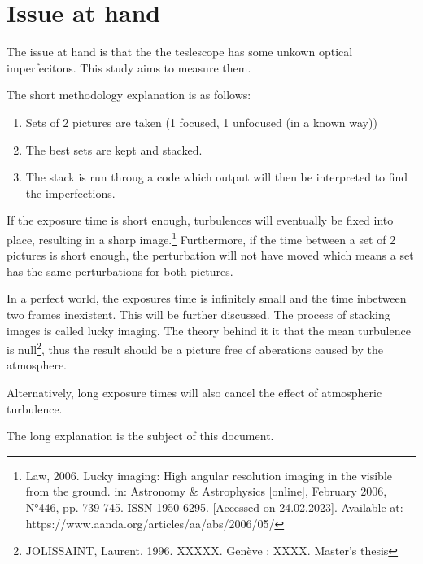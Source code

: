 \section{Issue at hand}

The issue at hand is that the the teslescope has some unkown optical imperfecitons. This study aims to measure them.

The short methodology explanation is as follows:
\begin{enumerate}
    \item Sets of 2 pictures are taken (1 focused, 1 unfocused (in a known way))
    \item The best sets are kept and stacked.
    \item The stack is run throug a code which output will then be interpreted to find the imperfections.
\end{enumerate}

If the exposure time is short enough, turbulences will eventually be fixed into place, resulting in a sharp image.\footnote{\cite{Law_lucky} Law, 2006. Lucky imaging: High angular resolution imaging in the visible from the ground. in: Astronomy \& Astrophysics [online], February 2006, N°446, pp. 739-745. ISSN
1950-6295. [Accessed on 24.02.2023]. Available at: https://www.aanda.org/articles/aa/abs/2006/05/} Furthermore, if the time between a set of 2 pictures is short enough, the perturbation will not have moved which means a set has the same perturbations for both pictures.

In a perfect world, the exposures time is infinitely small and the time inbetween two frames inexistent. This will be further discussed.
The process of stacking images is called lucky imaging. The theory behind it it that the mean turbulence is null\footnote{\cite{JOLISSAINT_master} JOLISSAINT, Laurent, 1996. XXXXX. Genève : XXXX. Master's thesis}, thus the result should be a picture free of aberations caused by the atmosphere.

Alternatively, long exposure times will also cancel the effect of atmospheric turbulence.

The long explanation is the subject of this document.

